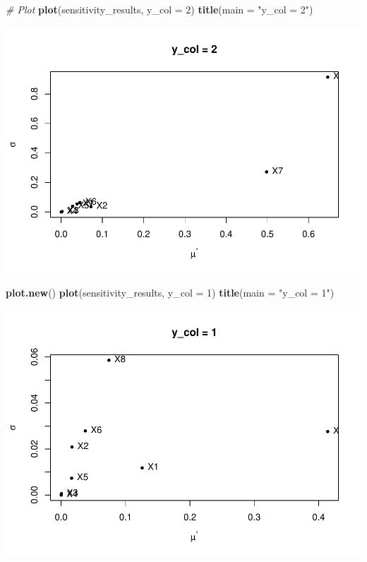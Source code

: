 \documentclass[
]{book}
\newenvironment{Shaded}{\begin{snugshade}}{\end{snugshade}}
\newcommand{\AttributeTok}[1]{\textcolor[rgb]{0.13,0.29,0.53}{#1}}
\newcommand{\CommentTok}[1]{\textcolor[rgb]{0.56,0.35,0.01}{\textit{#1}}}
\newcommand{\DecValTok}[1]{\textcolor[rgb]{0.00,0.00,0.81}{#1}}
\newcommand{\FunctionTok}[1]{\textcolor[rgb]{0.13,0.29,0.53}{\textbf{#1}}}
\newcommand{\NormalTok}[1]{#1}
\newcommand{\StringTok}[1]{\textcolor[rgb]{0.31,0.60,0.02}{#1}}
\begin{document}
\begin{Shaded}
\begin{Highlighting}[]
\CommentTok{\# Plot}
\FunctionTok{plot}\NormalTok{(sensitivity\_results, }\AttributeTok{y\_col =} \DecValTok{2}\NormalTok{)}
\FunctionTok{title}\NormalTok{(}\AttributeTok{main =} \StringTok{"y\_col = 2"}\NormalTok{)}
\end{Highlighting}
\end{Shaded}

\includegraphics{fig/unnamed-chunk-3-1.pdf}

\begin{Shaded}
\begin{Highlighting}[]
\FunctionTok{plot.new}\NormalTok{()}
\FunctionTok{plot}\NormalTok{(sensitivity\_results, }\AttributeTok{y\_col =} \DecValTok{1}\NormalTok{)}
\FunctionTok{title}\NormalTok{(}\AttributeTok{main =} \StringTok{"y\_col = 1"}\NormalTok{)}
\end{Highlighting}
\end{Shaded}

\includegraphics{fig/unnamed-chunk-4-1.pdf}
\end{document}
